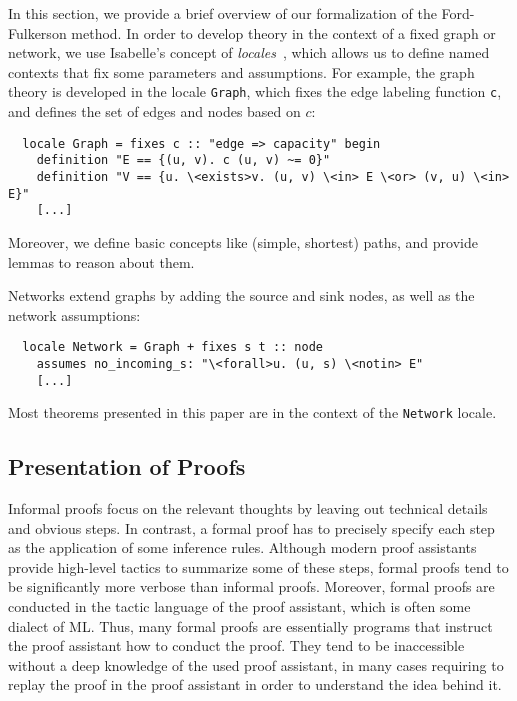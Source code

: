 \documentclass[smallcondensed]{svjour3}     %
\newcommand{\isai}{\lstinline[language=isabelle,basicstyle=\normalsize\ttfamily\slshape]}
\begin{document}

In this section, we provide a brief overview of our formalization of the Ford-Fulkerson method. 
In order to develop theory in the context of a fixed graph or network, we use Isabelle's concept of \emph{locales}~\cite{Ballarin:2006:MKM}, which allows
us to define named contexts that fix some parameters and assumptions.
For example, the graph theory is developed in the locale \isai{Graph}, which 
fixes the edge labeling function \isai{c}, and defines the set of edges and nodes based on $c$:
\begin{lstlisting}
  locale Graph = fixes c :: "edge => capacity" begin
    definition "E == {(u, v). c (u, v) ~= 0}"
    definition "V == {u. \<exists>v. (u, v) \<in> E \<or> (v, u) \<in> E}"
    [...]
\end{lstlisting}
Moreover, we define basic concepts like (simple, shortest) paths, and provide lemmas to reason about them.

Networks extend graphs by adding the source and sink nodes, as well as the network assumptions:
\begin{lstlisting}
  locale Network = Graph + fixes s t :: node
    assumes no_incoming_s: "\<forall>u. (u, s) \<notin> E"
    [...]
\end{lstlisting}
Most theorems presented in this paper are in the context of the \isai{Network} locale.

\subsection{Presentation of Proofs}
Informal proofs focus on the relevant thoughts by leaving out technical details and obvious steps. 
In contrast, a formal proof has to precisely specify each step as the application of some inference rules. 
Although modern proof assistants provide high-level tactics to summarize some of these steps, formal proofs tend to be significantly more 
verbose than informal proofs. Moreover, formal proofs are conducted in the tactic language of the proof assistant, which is often some dialect of ML. 
Thus, many formal proofs are essentially programs that instruct the proof assistant how to conduct the proof. They tend to be inaccessible without a deep knowledge of the used proof assistant, in many cases requiring to replay the proof in the proof assistant in order to understand the idea behind it.
\end{document}
